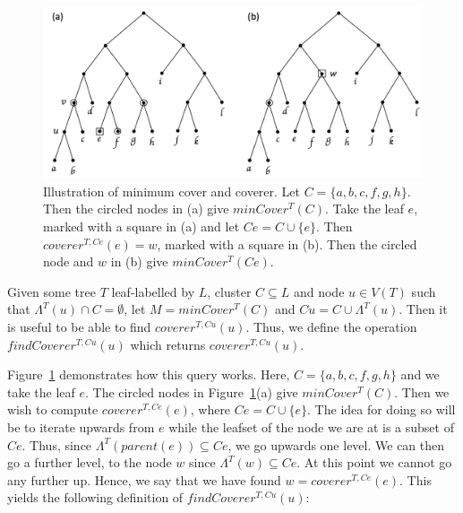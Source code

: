 \documentclass{article}
\newcommand{\leafset}{\Lambda}
\begin{document}
    \begin{figure}[ht]
        \includegraphics[scale=0.48]{mincoverrecursive}
        \centering
        \caption[Minimum cover and coverer]{Illustration of minimum cover and coverer. Let $C = \{a, b, c, f, g, h\}$. Then the circled nodes in (a) give $minCover^{T}(C)$. Take the leaf $e$, marked with a square in (a) and let $Ce = C \cup \{e\}$. Then $coverer^{T, Ce}(e) = w$, marked with a square in (b). Then the circled node and $w$ in (b) give $minCover^{T}(Ce)$.}
        \label{fig:mincoverrecursive}
    \end{figure}

    Given some tree $T$ leaf-labelled by $L$, cluster $C \subseteq L$ and node $u \in V(T)$ such that $\leafset^{T}(u) \cap C = \emptyset$, let $M = minCover^{T}(C)$ and $Cu = C \cup \leafset^{T}(u)$. Then it is useful to be able to find $coverer^{T, Cu}(u)$. Thus, we define the operation $findCoverer^{T, Cu}(u)$ which returns $coverer^{T, Cu}(u)$.

    Figure~\ref{fig:mincoverrecursive} demonstrates how this query works. Here, $C = \{a, b, c, f, g, h\}$ and we take the leaf $e$. The circled nodes in Figure~\ref{fig:mincoverrecursive}(a) give $minCover^{T}(C)$. Then we wish to compute $coverer^{T, Ce}(e)$, where $Ce = C \cup \{e\}$. The idea for doing so will be to iterate upwards from $e$ while the leafset of the node we are at is a subset of $Ce$. Thus, since $\leafset^{T}(parent(e)) \subseteq Ce$, we go upwards one level. We can then go a further  level, to the node $w$ since $\leafset^{T}(w) \subseteq Ce$. At this point we cannot go any further up. Hence, we say that we have found $w = coverer^{T, Ce}(e)$. This yields the following definition of $findCoverer^{T, Cu}(u)$:
    \newline
\end{document}
